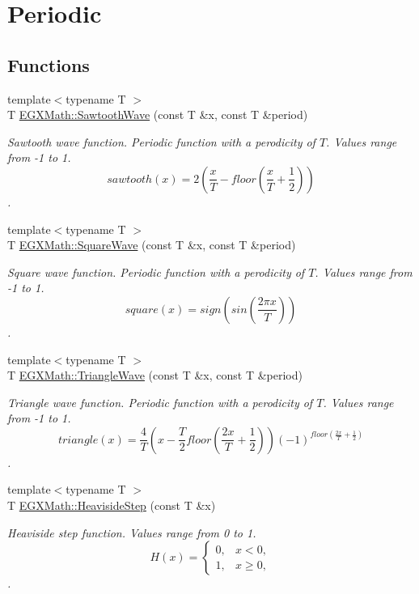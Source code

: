\hypertarget{group___e_g_x_math-_functions-_periodic}{}\section{Periodic}
\label{group___e_g_x_math-_functions-_periodic}
\subsection*{Functions}
\begin{DoxyCompactItemize}
\item 
{\footnotesize template$<$typename T $>$ }\\T \mbox{\hyperlink{group___e_g_x_math-_functions-_periodic_ga3eab4a0455f64881f9c183987682d85c}{E\+G\+X\+Math\+::\+Sawtooth\+Wave}} (const T \&x, const T \&period)
\begin{DoxyCompactList}\small\item\em Sawtooth wave function. Periodic function with a perodicity of $T$. Values range from -\/1 to 1. \[sawtooth(x)=2(\frac{x}{T} - floor(\frac{x}{T} + \frac{1}{2}))\]. \end{DoxyCompactList}\item 
{\footnotesize template$<$typename T $>$ }\\T \mbox{\hyperlink{group___e_g_x_math-_functions-_periodic_ga3bdc6c02d347f48f91bca886448db33a}{E\+G\+X\+Math\+::\+Square\+Wave}} (const T \&x, const T \&period)
\begin{DoxyCompactList}\small\item\em Square wave function. Periodic function with a perodicity of $T$. Values range from -\/1 to 1. \[square(x)= sign( sin (\frac{2 \pi x}{T})) \]. \end{DoxyCompactList}\item 
{\footnotesize template$<$typename T $>$ }\\T \mbox{\hyperlink{group___e_g_x_math-_functions-_periodic_gafa81ebd66ef7cd080370fad972d6ac50}{E\+G\+X\+Math\+::\+Triangle\+Wave}} (const T \&x, const T \&period)
\begin{DoxyCompactList}\small\item\em Triangle wave function. Periodic function with a perodicity of $T$. Values range from -\/1 to 1. \[triangle(x)= \frac{4}{T}(x-\frac{T}{2} floor(\frac{2 x}{T}+\frac{1}{2}) )(-1)^{floor(\frac{2 x}{T}+\frac{1}{2})} \]. \end{DoxyCompactList}\item 
{\footnotesize template$<$typename T $>$ }\\T \mbox{\hyperlink{group___e_g_x_math-_functions-_periodic_ga0fb325d5423606e9c222e1ebd6a65833}{E\+G\+X\+Math\+::\+Heaviside\+Step}} (const T \&x)
\begin{DoxyCompactList}\small\item\em Heaviside step function. Values range from 0 to 1. \[H(x)=\begin{cases} 0, & x < 0, \\ 1, & x \ge 0, \end{cases} \]. \end{DoxyCompactList}\end{DoxyCompactItemize}


